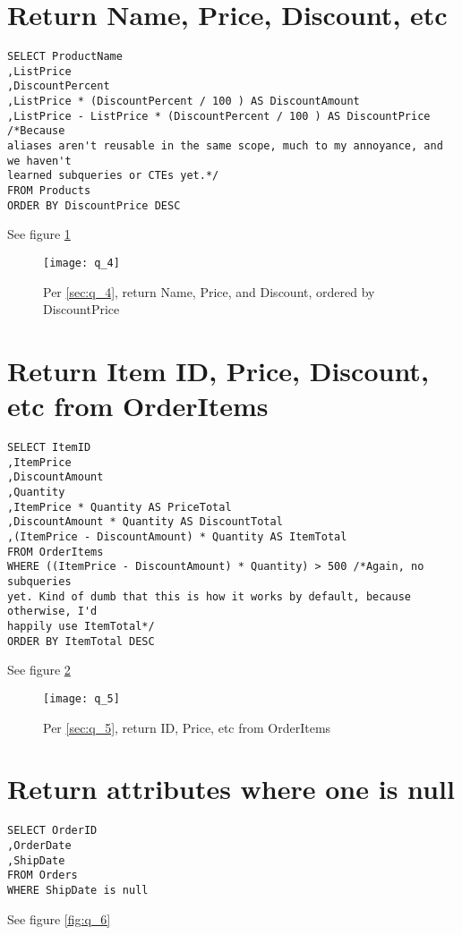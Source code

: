 \documentclass{article}
\begin{document}
\section{Return Name, Price, Discount, etc}

\begin{lstlisting}
SELECT ProductName
,ListPrice
,DiscountPercent
,ListPrice * (DiscountPercent / 100 ) AS DiscountAmount
,ListPrice - ListPrice * (DiscountPercent / 100 ) AS DiscountPrice /*Because
aliases aren't reusable in the same scope, much to my annoyance, and we haven't
learned subqueries or CTEs yet.*/
FROM Products
ORDER BY DiscountPrice DESC
\end{lstlisting}\label{sec:q_4}
See figure \ref{fig:q_4}

\begin{figure}[H]\centering
	\caption{Per \ref{sec:q_4}, return Name, Price, and Discount, ordered
	by DiscountPrice}
	\texttt{[image: q\_4]}
	\label{fig:q_4}
\end{figure}

\section{Return Item ID, Price, Discount, etc from OrderItems}

\begin{lstlisting}
SELECT ItemID
,ItemPrice
,DiscountAmount
,Quantity
,ItemPrice * Quantity AS PriceTotal
,DiscountAmount * Quantity AS DiscountTotal
,(ItemPrice - DiscountAmount) * Quantity AS ItemTotal
FROM OrderItems
WHERE ((ItemPrice - DiscountAmount) * Quantity) > 500 /*Again, no subqueries
yet. Kind of dumb that this is how it works by default, because otherwise, I'd
happily use ItemTotal*/
ORDER BY ItemTotal DESC
\end{lstlisting}\label{sec:q_5}
See figure \ref{fig:q_5}

\begin{figure}[H]\centering
	\caption{Per \ref{sec:q_5}, return ID, Price, etc from OrderItems}
	\texttt{[image: q\_5]}
	\label{fig:q_5}
\end{figure}

\section{Return attributes where one is null}

\begin{lstlisting}
SELECT OrderID
,OrderDate
,ShipDate
FROM Orders
WHERE ShipDate is null
\end{lstlisting}\label{sec:q_6}
See figure \ref{fig:q_6}
\end{document}
